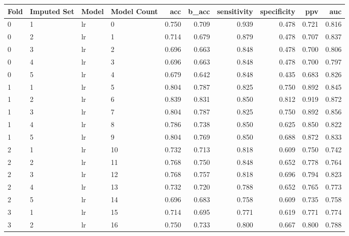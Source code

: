 \begin{tabular}{llllrrrrrr}
\toprule
Fold & Imputed Set & Model & Model Count &   acc &  b\_acc &  sensitivity &  specificity &   ppv &   auc \\
\midrule
   0 &           1 &    lr &           0 & 0.750 &  0.709 &        0.939 &        0.478 & 0.721 & 0.816 \\
   0 &           2 &    lr &           1 & 0.714 &  0.679 &        0.879 &        0.478 & 0.707 & 0.837 \\
   0 &           3 &    lr &           2 & 0.696 &  0.663 &        0.848 &        0.478 & 0.700 & 0.806 \\
   0 &           4 &    lr &           3 & 0.696 &  0.663 &        0.848 &        0.478 & 0.700 & 0.797 \\
   0 &           5 &    lr &           4 & 0.679 &  0.642 &        0.848 &        0.435 & 0.683 & 0.826 \\
   1 &           1 &    lr &           5 & 0.804 &  0.787 &        0.825 &        0.750 & 0.892 & 0.845 \\
   1 &           2 &    lr &           6 & 0.839 &  0.831 &        0.850 &        0.812 & 0.919 & 0.872 \\
   1 &           3 &    lr &           7 & 0.804 &  0.787 &        0.825 &        0.750 & 0.892 & 0.856 \\
   1 &           4 &    lr &           8 & 0.786 &  0.738 &        0.850 &        0.625 & 0.850 & 0.822 \\
   1 &           5 &    lr &           9 & 0.804 &  0.769 &        0.850 &        0.688 & 0.872 & 0.833 \\
   2 &           1 &    lr &          10 & 0.732 &  0.713 &        0.818 &        0.609 & 0.750 & 0.742 \\
   2 &           2 &    lr &          11 & 0.768 &  0.750 &        0.848 &        0.652 & 0.778 & 0.764 \\
   2 &           3 &    lr &          12 & 0.768 &  0.757 &        0.818 &        0.696 & 0.794 & 0.823 \\
   2 &           4 &    lr &          13 & 0.732 &  0.720 &        0.788 &        0.652 & 0.765 & 0.773 \\
   2 &           5 &    lr &          14 & 0.696 &  0.683 &        0.758 &        0.609 & 0.735 & 0.758 \\
   3 &           1 &    lr &          15 & 0.714 &  0.695 &        0.771 &        0.619 & 0.771 & 0.774 \\
   3 &           2 &    lr &          16 & 0.750 &  0.733 &        0.800 &        0.667 & 0.800 & 0.788 \\

\end{tabular}
